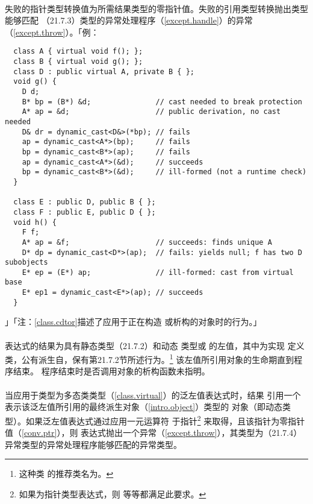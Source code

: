 \paragraph{}
失败的指针类型转换值为所需结果类型的零指针值。失败的引用类型转换抛出类型能够匹配
（21.7.3）类型的异常处理程序（\ref{except.handle}）的异常
（\ref{except.throw}）。「例：
\begin{lstlisting}
  class A { virtual void f(); };
  class B { virtual void g(); };
  class D : public virtual A, private B { };
  void g() {
    D d;
    B* bp = (B*) &d;               // cast needed to break protection
    A* ap = &d;                    // public derivation, no cast needed
    D& dr = dynamic_cast<D&>(*bp); // fails
    ap = dynamic_cast<A*>(bp);     // fails
    bp = dynamic_cast<B*>(ap);     // fails
    ap = dynamic_cast<A*>(&d);     // succeeds
    bp = dynamic_cast<B*>(&d);     // ill-formed (not a runtime check)
  }

  class E : public D, public B { };
  class F : public E, public D { };
  void h() {
    F f;
    A* ap = &f;                    // succeeds: finds unique A
    D* dp = dynamic_cast<D*>(ap);  // fails: yields null; f has two D subobjects
    E* ep = (E*) ap;               // ill-formed: cast from virtual base
    E* ep1 = dynamic_cast<E*>(ap); // succeeds
  }
\end{lstlisting}」「注：\ref{class.cdtor}描述了应用于正在构造
或析构的对象时的行为。」

\paragraph{}
表达式的结果为具有静态类型（21.7.2）和动态
类型或 的左值，其中为实现
定义类，公有派生自，保有第21.7.2节所述行为。\footnote{这种类
的推荐类名为。} 该左值所引用对象的生命期直到程序结束。
程序结束时是否调用对象的析构函数未指明。

\paragraph{}
当应用于类型为多态类类型（\ref{class.virtual}）的泛左值表达式时，结果
引用一个表示该泛左值所引用的最终派生对象（\ref{intro.object}）类型的
对象（即动态类型）。如果泛左值表达式通过应用一元\tm{*}运算符
于指针\footnote{如果为指针类型表达式，则
等等都满足此要求。} 来取得，且该指针为零指针值（\ref{conv.ptr}），则
表达式抛出一个异常（\ref{except.throw}），其类型为（21.7.4）
异常类型的异常处理程序能够匹配的异常类型。

